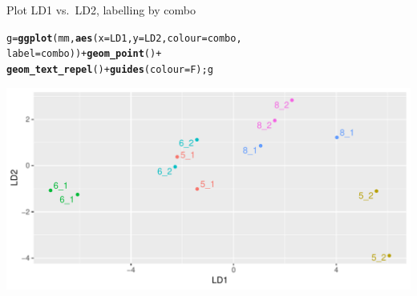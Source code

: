 \documentclass[unknownkeysallowed]{beamer}\usepackage[]{graphicx}\usepackage[]{color}
\makeatletter
\def\maxwidth{ %
  \ifdim\Gin@nat@width>\linewidth
    \linewidth
  \else
    \Gin@nat@width
  \fi
}
\newcommand{\hlopt}[1]{\textcolor[rgb]{0,0,0}{#1}}%
\newcommand{\hlstd}[1]{\textcolor[rgb]{0.345,0.345,0.345}{#1}}%
\newcommand{\hlkwb}[1]{\textcolor[rgb]{0.69,0.353,0.396}{#1}}%
\newcommand{\hlkwc}[1]{\textcolor[rgb]{0.333,0.667,0.333}{#1}}%
\newcommand{\hlkwd}[1]{\textcolor[rgb]{0.737,0.353,0.396}{\textbf{#1}}}%
\newenvironment{kframe}{%
 \def\at@end@of@kframe{}%
 \ifinner\ifhmode%
  \def\at@end@of@kframe{\end{minipage}}%
  \begin{minipage}{\columnwidth}%
 \fi\fi%
 \def\FrameCommand##1{\hskip\@totalleftmargin \hskip-\fboxsep
 \colorbox{shadecolor}{##1}\hskip-\fboxsep
     \hskip-\linewidth \hskip-\@totalleftmargin \hskip\columnwidth}%
 \MakeFramed {\advance\hsize-\width
   \@totalleftmargin\z@ \linewidth\hsize
   \@setminipage}}%
 {\par\unskip\endMakeFramed%
 \at@end@of@kframe}
\newenvironment{knitrout}{}{} %
\makeatother
\begin{document}
  
\begin{frame}[fragile]{Plot LD1 vs.\ LD2, labelling by combo}
  
\begin{knitrout}
\color{fgcolor}\begin{kframe}
\begin{alltt}
\hlstd{g}\hlkwb{=}\hlkwd{ggplot}\hlstd{(mm,}\hlkwd{aes}\hlstd{(}\hlkwc{x}\hlstd{=LD1,}\hlkwc{y}\hlstd{=LD2,}\hlkwc{colour}\hlstd{=combo,}
  \hlkwc{label}\hlstd{=combo))}\hlopt{+}\hlkwd{geom_point}\hlstd{()}\hlopt{+}
  \hlkwd{geom_text_repel}\hlstd{()}\hlopt{+}\hlkwd{guides}\hlstd{(}\hlkwc{colour}\hlstd{=F) ; g}
\end{alltt}
\end{kframe}
\includegraphics[width=\maxwidth]{figure/unnamed-chunk-286-1} 

\end{knitrout}
  
\end{frame}
\end{document}
